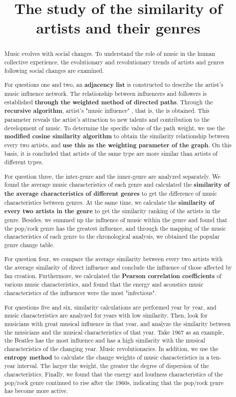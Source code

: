 \documentclass[12pt]{article}  %
\title{The study of the similarity of artists and their genres}  %
\begin{document}
\begin{abstract}

Music evolves with social changes. To understand the role of music in the human collective experience,  the evolutionary and revolutionary trends of artists and genres following social changes are examined. 

For questions one and two, an \textbf{adjacency list} is constructed to describe the artist's music influence network. The relationship between influencers and followers is established \textbf{through the weighted method of directed paths}. Through the \textbf{recursive algorithm}, artist's "music influence" , that is, the  is obtained. This parameter reveals the artist's attraction to new talents and contribution to the development of music. To determine the specific value of the path weight, we use the \textbf{modified cosine similarity algorithm} to obtain the similarity relationship between every two artists, and \textbf{use this as the weighting parameter of the graph}. On this basis, it is concluded that artists of the same type are more similar than artists of different types. 

For question three, the inter-genre and the inner-genre are analyzed separately. We found the average music characteristics of each genre and calculated the \textbf{similarity of the average characteristics of different genres} to get the difference of music characteristics between genres. At the same time, we calculate the \textbf{similarity of every two artists in the genre} to get the similarity ranking of the artists in the genre. Besides, we summed up the influence of music within the genre and found that the pop/rock genre has the greatest influence, and through the mapping of the music characteristics of each genre to the chronological analysis, we obtained the popular genre change table. 

For question four, we compare the average similarity between every two artists with the average similarity of direct influence and conclude the influence of those affected by fan creation. Furthermore, we calculated the \textbf{Pearson correlation coefficients} of various music characteristics, and found that the energy and acoustics music characteristics of the influencer were the most "infectious".

For questions five and six, similarity calculations are performed year by year, and music characteristics are analyzed for years with low similarity. Then, look for musicians with great musical influence in that year, and analyze the similarity between the musicians and the musical characteristics of that year. Take 1967 as an example, the Beatles has the most influence and has a high similarity with the musical characteristics of the changing year. Music revolutionaries. In addition, we use the \textbf{entropy method} to calculate the change weights of music characteristics in a ten-year interval. The larger the weight, the greater the degree of dispersion of the characteristics. Finally, we found that the energy and loudness characteristics of the pop/rock genre continued to rise after the 1960s, indicating that the pop/rock genre has become more active.


\end{abstract}
\end{document}
